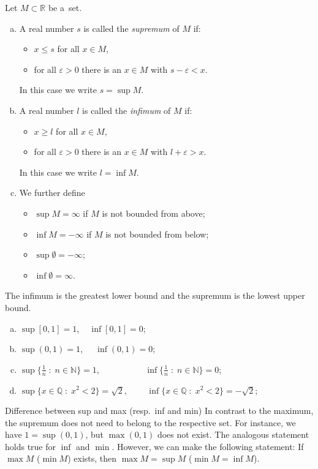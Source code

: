 
\begin{Definition}
Let $M\subset \mathbb{R}$ be a~set.
\begin{enumerate}[(a)]
 \item  A real number $s$
     is called the \emph{supremum} of $M$ if:
 	\begin{itemize}
 		\item $x\leq s$ for all $x \in M$,
 		\item for all $\varepsilon > 0$ there is an $x \in M$ with $s-\varepsilon < x$.
 	\end{itemize}
In this case we write $s=\sup M$.
 \item  A real number $l$
     is called the \emph{infimum} of $M$ if:
 	\begin{itemize}
 		\item $x\geq l$ for all $x \in M$,
 		\item for all $\varepsilon > 0$ there is an $x \in M$ with $l + \varepsilon > x$.
 	\end{itemize}
In this case we write $l=\inf M$.
\item We further define
\begin{itemize}
 \item $\sup M=\infty$ if $M$ is not bounded from above;
 \item $\inf M=-\infty$ if $M$ is not bounded from below;
 \item $\sup \emptyset =-\infty$;
 \item $\inf \emptyset  =\infty$.
\end{itemize}
\end{enumerate}
\end{Definition}

\begin{Remember}
 The infimum is the greatest lower bound and the supremum is the lowest upper bound.
\end{Remember}

\begin{example}
\begin{enumerate}[(a)]
\item $\sup[0,1]=1$, $\;\;\;\inf[0,1]=0$;
	\whiteskipsmall
\item $\sup (0,1) = 1$, $\;\;\;\;\inf (0,1) = 0$;
	\whiteskipsmall
    \item $\sup\{\frac1n\;:\;n\in\mathbb{N}\}=1$, $\qquad\qquad\;\;\;\,\inf\{\frac1n\;:\;n\in\mathbb{N}\}=0$;
	\whiteskipsmall
    \item $\sup\{x\in\mathbb{Q}\;:\;x^2<2\}=\sqrt{2}$, $\qquad\inf\{x\in\mathbb{Q}\;:\;x^2<2\}=-\sqrt{2}$;
\end{enumerate}
\end{example}

\begin{Remark}{Difference between sup and max (resp.\ inf and min)}
In contrast to the maximum, the supremum does not need to belong to the respective set. For instance, we have $1=\sup(0,1)$, but $\max(0,1)$ does not exist.
The analogous statement holds true for $\inf$ and $\min$. However, we can make the following statement: If $\max M$ ($\min M$) exists, then $\max M=\sup M$ ($\min M=\inf M$).
\end{Remark}
